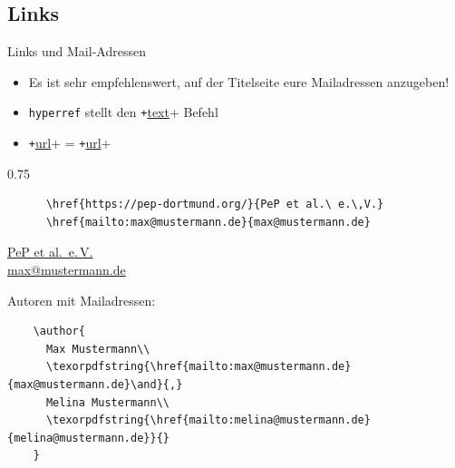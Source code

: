 \subsection{Links}
\begin{frame}[fragile]{Links und Mail-Adressen}
  \begin{itemize}
    \item Es ist sehr empfehlenswert, auf der Titelseite eure Mailadressen anzugeben!
    \item \texttt{hyperref} stellt den \texttt+\href{link}{text}+ Befehl
    \item \texttt+\url{url}+ = \texttt+\href{url}{url}+
  \end{itemize}
  \vspace{-0.6em}
  \begin{CodeExample}{0.75}
    \begin{verbatim}
      \href{https://pep-dortmund.org/}{PeP et al.\ e.\,V.}
      \href{mailto:max@mustermann.de}{max@mustermann.de}
    \end{verbatim}
  \CodeResult
    \strut
    \href{https://pep-dortmund.org/}{PeP et al.\ e.\,V.}\\
    \href{mailto:max@mustermann.de}{max@mustermann.de}
  \end{CodeExample}
  \begin{block}{Autoren mit Mailadressen:}
    \begin{verbatim}
    \author{
      Max Mustermann\\
      \texorpdfstring{\href{mailto:max@mustermann.de}{max@mustermann.de}\and}{,}
      Melina Mustermann\\
      \texorpdfstring{\href{mailto:melina@mustermann.de}{melina@mustermann.de}}{}
    }
    \end{verbatim}
  \end{block}
\end{frame}
